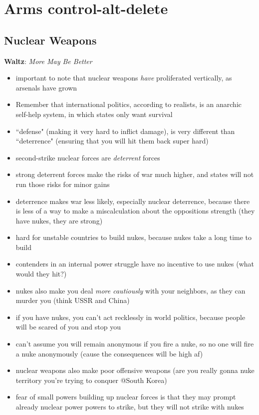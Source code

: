 \documentclass{article}
\begin{document}
\section*{Arms control-alt-delete}
\subsection*{Nuclear Weapons}
\textbf{Waltz}: \textit{More May Be Better}
\begin{itemize}
    \item important to note that nuclear weapons \textit{have} proliferated vertically, as arsenals have grown
    \item Remember that international politics, according to realists, is an anarchic self-help system, in which states only want survival
    \item ``defense" (making it very hard to inflict damage), is very different than ``deterrence" (ensuring that you will hit them back super hard)
    \item second-strike nuclear forces are \textit{deterrent} forces
    \item strong deterrent forces make the risks of war much higher, and states will not run those risks for minor gains
    \item deterrence makes war less likely, especially nuclear deterrence, because there is less of a way to make a miscalculation about the oppositions strength (they have nukes, they are strong)
    \item hard for unstable countries to build nukes, because nukes take a long time to build
    \item contenders in an internal power struggle have no incentive to use nukes (what would they hit?)
    \item nukes also make you deal \textit{more cautiously} with your neighbors, as they can murder you (think USSR and China)
    \item if you have nukes, you can't act recklessly in world politics, because people will be scared of you and stop you
    \item can't assume you will remain anonymous if you fire a nuke, so no one will fire a nuke anonymously (cause the consequences will be high af)
    \item nuclear weapons also make poor offensive weapons (are you really gonna nuke territory you're trying to conquer @South Korea)
    \item fear of small powers building up nuclear forces is that they may prompt already nuclear power powers to strike, but they will not strike with nukes

\end{itemize}
\end{document}
